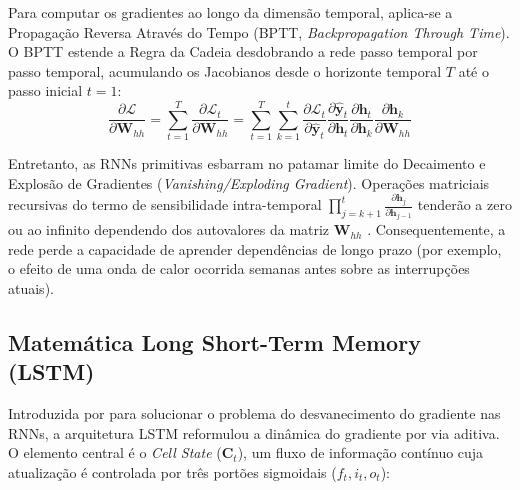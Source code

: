 Para computar os gradientes ao longo da dimensão temporal, aplica-se a Propagação Reversa Através do Tempo (BPTT, \textit{Backpropagation Through Time}). O BPTT estende a Regra da Cadeia desdobrando a rede passo temporal por passo temporal, acumulando os Jacobianos desde o horizonte temporal $T$ até o passo inicial $t=1$:
\begin{equation}
    \frac{\partial \mathcal{L}}{\partial \textbf{W}_{hh}} = \sum_{t=1}^T \frac{\partial \mathcal{L}_t}{\partial \textbf{W}_{hh}} = \sum_{t=1}^T \sum_{k=1}^t \frac{\partial \mathcal{L}_t}{\partial \hat{\textbf{y}}_t} \frac{\partial \hat{\textbf{y}}_t}{\partial \textbf{h}_t} \frac{\partial \textbf{h}_t}{\partial \textbf{h}_k} \frac{\partial \textbf{h}_k}{\partial \textbf{W}_{hh}}
    \label{eq:bptt_equation}
\end{equation}

Entretanto, as RNNs primitivas esbarram no patamar limite do Decaimento e Explosão de Gradientes (\textit{Vanishing/Exploding Gradient}). Operações matriciais recursivas do termo de sensibilidade intra-temporal $\prod_{j=k+1}^t \frac{\partial \textbf{h}_j}{\partial \textbf{h}_{j-1}}$ tenderão a zero ou ao infinito dependendo dos autovalores da matriz $\textbf{W}_{hh}$ \cite{pascanu2013difficulty}. Consequentemente, a rede perde a capacidade de aprender dependências de longo prazo (por exemplo, o efeito de uma onda de calor ocorrida semanas antes sobre as interrupções atuais).

\subsection{Matemática Long Short-Term Memory (LSTM)}
Introduzida por \cite{hochreiter1997long} para solucionar o problema do desvanecimento do gradiente nas RNNs, a arquitetura LSTM reformulou a dinâmica do gradiente por via aditiva. O elemento central é o \textit{Cell State} ($\textbf{C}_t$), um fluxo de informação contínuo cuja atualização é controlada por três portões sigmoidais ($f_t, i_t, o_t$):

